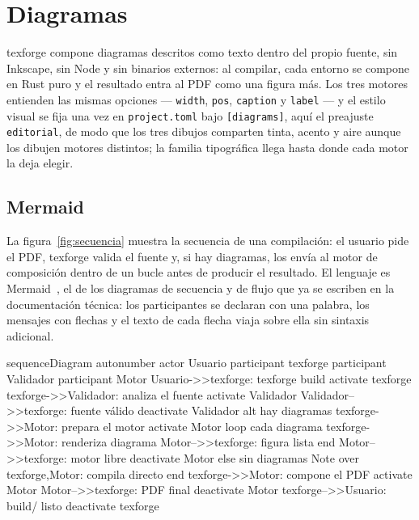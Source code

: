\section{Diagramas}\label{sec:diagramas}

texforge compone diagramas descritos como texto dentro del propio fuente,
sin Inkscape, sin Node y sin binarios externos: al compilar, cada entorno se
compone en Rust puro y el resultado entra al PDF como una figura más.
Los tres motores entienden las mismas opciones --- \texttt{width},
\texttt{pos}, \texttt{caption} y \texttt{label} --- y el estilo visual se
fija una vez en \texttt{project.toml} bajo \texttt{[diagrams]}, aquí el
preajuste \texttt{editorial}, de modo que los tres dibujos comparten tinta,
acento y aire aunque los dibujen motores distintos; la familia tipográfica
llega hasta donde cada motor la deja elegir.

\subsection{Mermaid}

La figura~\ref{fig:secuencia} muestra la secuencia de una compilación: el
usuario pide el PDF, texforge valida el fuente y, si hay diagramas, los
envía al motor de composición dentro de un bucle antes de producir el
resultado. El lenguaje es Mermaid~\cite{mermaid}, el de los diagramas de
secuencia y de flujo que ya se escriben en la documentación técnica: los
participantes se declaran con una palabra, los mensajes con flechas y el
texto de cada flecha viaja sobre ella sin sintaxis adicional.

\begin{mermaid}[width=0.9\linewidth, caption={Secuencia de compilación con texforge}, label={fig:secuencia}, pos=H]
  sequenceDiagram
  autonumber
  actor Usuario
  participant texforge
  participant Validador
  participant Motor
  Usuario->>texforge: texforge build
  activate texforge
  texforge->>Validador: analiza el fuente
  activate Validador
  Validador-->>texforge: fuente válido
  deactivate Validador
  alt hay diagramas
  texforge->>Motor: prepara el motor
  activate Motor
  loop cada diagrama
  texforge->>Motor: renderiza diagrama
  Motor-->>texforge: figura lista
  end
  Motor-->>texforge: motor libre
  deactivate Motor
  else sin diagramas
  Note over texforge,Motor: compila directo
  end
  texforge->>Motor: compone el PDF
  activate Motor
  Motor-->>texforge: PDF final
  deactivate Motor
  texforge-->>Usuario: build/ listo
  deactivate texforge
\end{mermaid}

